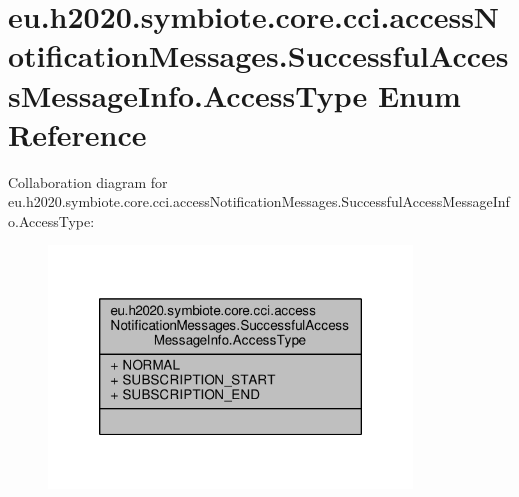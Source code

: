 \hypertarget{enumeu_1_1h2020_1_1symbiote_1_1core_1_1cci_1_1accessNotificationMessages_1_1SuccessfulAccessMessageInfo_1_1AccessType}{}\section{eu.\+h2020.\+symbiote.\+core.\+cci.\+access\+Notification\+Messages.\+Successful\+Access\+Message\+Info.\+Access\+Type Enum Reference}
\label{enumeu_1_1h2020_1_1symbiote_1_1core_1_1cci_1_1accessNotificationMessages_1_1SuccessfulAccessMessageInfo_1_1AccessType}


Collaboration diagram for eu.\+h2020.\+symbiote.\+core.\+cci.\+access\+Notification\+Messages.\+Successful\+Access\+Message\+Info.\+Access\+Type\+:
\nopagebreak
\begin{figure}[H]
\begin{center}
\leavevmode
\includegraphics[width=274pt]{enumeu_1_1h2020_1_1symbiote_1_1core_1_1cci_1_1accessNotificationMessages_1_1SuccessfulAccessMess131562838eb77d3dc219d51d4199365b}
\end{center}
\end{figure}
